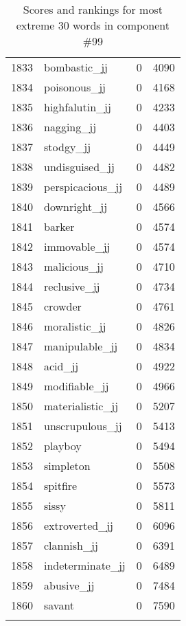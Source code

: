 \begin{longtable}[!htbp]{| rlr@{.}l |}
    1833 & bombastic\_jj & 0 & 4090 \\
    1834 & poisonous\_jj & 0 & 4168 \\
    1835 & highfalutin\_jj & 0 & 4233 \\
    1836 & nagging\_jj & 0 & 4403 \\
    1837 & stodgy\_jj & 0 & 4449 \\
    1838 & undisguised\_jj & 0 & 4482 \\
    1839 & perspicacious\_jj & 0 & 4489 \\
    1840 & downright\_jj & 0 & 4566 \\
    1841 & barker & 0 & 4574 \\
    1842 & immovable\_jj & 0 & 4574 \\
    1843 & malicious\_jj & 0 & 4710 \\
    1844 & reclusive\_jj & 0 & 4734 \\
    1845 & crowder & 0 & 4761 \\
    1846 & moralistic\_jj & 0 & 4826 \\
    1847 & manipulable\_jj & 0 & 4834 \\
    1848 & acid\_jj & 0 & 4922 \\
    1849 & modifiable\_jj & 0 & 4966 \\
    1850 & materialistic\_jj & 0 & 5207 \\
    1851 & unscrupulous\_jj & 0 & 5413 \\
    1852 & playboy & 0 & 5494 \\
    1853 & simpleton & 0 & 5508 \\
    1854 & spitfire & 0 & 5573 \\
    1855 & sissy & 0 & 5811 \\
    1856 & extroverted\_jj & 0 & 6096 \\
    1857 & clannish\_jj & 0 & 6391 \\
    1858 & indeterminate\_jj & 0 & 6489 \\
    1859 & abusive\_jj & 0 & 7484 \\
    1860 & savant & 0 & 7590 \\
    \hline
    \caption{Scores and rankings for most extreme 30 words in component \#99} \\
\end{longtable}

